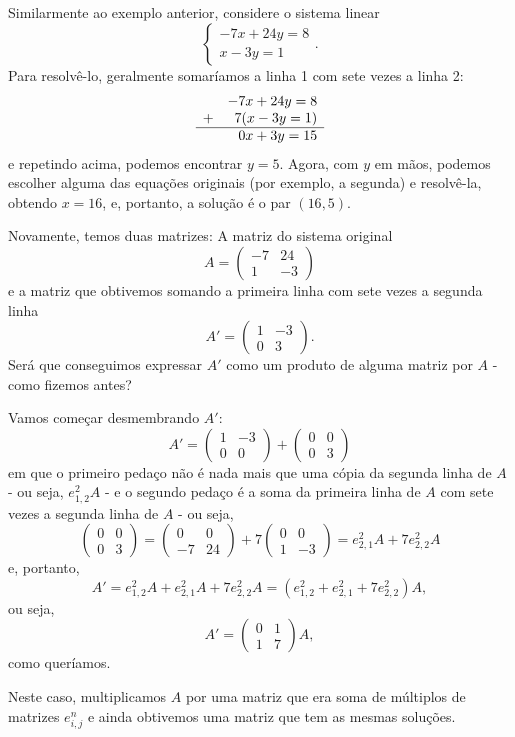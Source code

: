 \begin{ex}
	Similarmente ao exemplo anterior, considere o sistema linear
	\[\begin{cases}
	-7x+24y=8\\
	x-3y=1
	\end{cases}.\]Para resolvê-lo, geralmente somaríamos a linha 1 com sete vezes a linha 2:
	\[
	\begin{array}[b]{lr}
	&-7x+24y=8\\
	+&7(x-3y=1)\\
	\hline
	&0x+3y=15
	\end{array}
	\]e repetindo acima, podemos encontrar $y=5$. Agora, com $y$ em mãos, podemos escolher alguma das equações originais (por exemplo, a segunda) e resolvê-la, obtendo $x=16$, e, portanto, a solução é o par $(16,5)$.
	
	\tcblower
	
	Novamente, temos duas matrizes: A matriz do sistema original
	\[A=\begin{pmatrix}
	-7 & 24\\1&-3
	\end{pmatrix}\]e a matriz que obtivemos somando a primeira linha com sete vezes a segunda linha
	\[A'=\begin{pmatrix}
	1&-3\\0&3
	\end{pmatrix}.\]Será que conseguimos expressar $A'$ como um produto de alguma matriz por $A$ - como fizemos antes?
	
	Vamos começar desmembrando $A'$:
	\[A'=\begin{pmatrix}
	1 & -3 \\0&0
	\end{pmatrix}+\begin{pmatrix}
	0&0\\0&3
	\end{pmatrix}\]em que o primeiro pedaço não é nada mais que uma cópia da segunda linha de $A$ - ou seja, $e^2_{1,2}A$ - e o segundo pedaço é a soma da primeira linha de $A$ com sete vezes a segunda linha de $A$ - ou seja, 
	\[\begin{pmatrix}
	0&0\\0&3
	\end{pmatrix}=\begin{pmatrix}
	0&0\\-7&24
	\end{pmatrix}+7\begin{pmatrix}
	0&0\\1&-3
	\end{pmatrix}=e^2_{2,1}A+7e^2_{2,2}A\]e, portanto, 
	\[A'=e^2_{1,2}A+e^2_{2,1}A+7e^2_{2,2}A=(e^2_{1,2}+e^2_{2,1}+7e^2_{2,2})A,\]ou seja,
	\[A'=\begin{pmatrix}
	0&1\\
	1 & 7
	\end{pmatrix}A,\]como queríamos.
	
	Neste caso, multiplicamos $A$ por uma matriz que era soma de múltiplos de matrizes $e^n_{i,j}$ e ainda obtivemos uma matriz que tem as mesmas soluções.
\end{ex}

